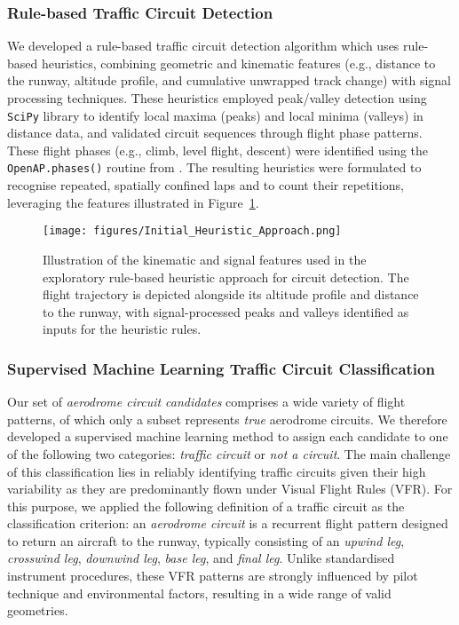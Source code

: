 \documentclass[
  manuscript=proceedings,  %
  layout=preprint,         %
  year=2025,
  volume=x,
]{extra/joas}
\begin{document}
\subsubsection{Rule-based Traffic Circuit Detection}
\label{sec:Rulebased_Circuit}
We developed a rule-based traffic circuit detection algorithm which uses rule-based heuristics, combining geometric and kinematic features (e.g., distance to the runway, altitude profile, and cumulative unwrapped track change) with signal processing techniques. These heuristics employed peak/valley detection using \texttt{SciPy} library \cite{2020SciPy-NMeth} to identify local maxima (peaks) and local minima (valleys) in distance data, and validated circuit sequences through flight phase patterns. These flight phases (e.g., climb, level flight, descent) were identified using the \texttt{OpenAP.phases()} routine from \textcite{sun2020openap}. The resulting heuristics were formulated to recognise repeated, spatially confined laps and to count their repetitions, leveraging the features illustrated in Figure~\ref{fig:heuristic_approach}.

\begin{figure}[ht!]
  \centering
  \texttt{[image: figures/Initial\_Heuristic\_Approach.png]}
    \caption{Illustration of the kinematic and signal features used in the exploratory rule-based heuristic approach for circuit detection. The flight trajectory is depicted alongside its altitude profile and distance to the runway, with signal-processed peaks and valleys identified as inputs for the heuristic rules.}
  \vspace{-1em}
  \label{fig:heuristic_approach}
\end{figure}

\subsubsection{Supervised Machine Learning Traffic Circuit Classification}
\label{sec:ml}
Our set of \textit{aerodrome circuit candidates} comprises a wide variety of flight patterns, of which only a subset represents \emph{true} aerodrome circuits. We therefore developed a supervised machine learning method to assign each candidate to one of the following two categories: \textit{traffic circuit} or \textit{not a circuit}. The main challenge of this classification lies in reliably identifying traffic circuits given their high variability as they are predominantly flown under Visual Flight Rules (VFR). For this purpose, we applied the following definition of a traffic circuit as the classification criterion: an \textit{aerodrome circuit} is a recurrent flight pattern designed to return an aircraft to the runway, typically consisting of an \textit{upwind leg}, \textit{crosswind leg}, \textit{downwind leg}, \textit{base leg}, and \textit{final leg}. Unlike standardised instrument procedures, these VFR patterns are strongly influenced by pilot technique and environmental factors, resulting in a wide range of valid geometries.
\end{document}
